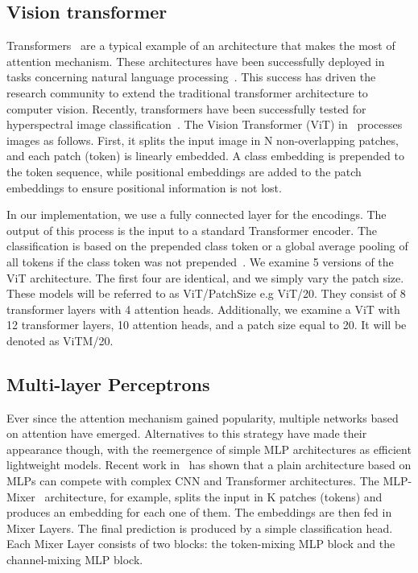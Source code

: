 \documentclass[journal]{IEEEtran}
\begin{document}
\subsection{Vision transformer}
\label{sec:vit}
Transformers~\citep{DBLP:journals/corr/VaswaniSPUJGKP17} are a typical example of an architecture that makes the most of attention mechanism. These architectures have been successfully deployed in tasks concerning natural language processing~\citep{devlin2018bert}. This success has driven the research community to extend the traditional transformer architecture to computer vision. Recently, transformers have been successfully tested for hyperspectral image classification~\citep{9565208}. 
The Vision Transformer (ViT) in~\cite{DBLP:journals/corr/abs-2010-11929} processes images as follows. First, it splits the input image in N non-overlapping patches, and each patch (token) is linearly embedded. A class embedding is prepended to the token sequence, while positional embeddings are added to the patch embeddings to ensure positional information is not lost. 

In our implementation, we use a fully connected layer for the encodings. The output of this process is the input to a standard Transformer encoder. The classification is based on the prepended class token or a global average pooling of all tokens if the class token was not prepended~\citep{arnab2021vivit}. 
 We examine 5 versions of the ViT architecture. The first four are identical, and we simply vary the patch size. These models will be referred to as ViT/PatchSize e.g ViT/20. They consist of 8 transformer layers with 4 attention heads. Additionally, we examine a ViT with 12 transformer layers, 10 attention heads, and a patch size equal to 20. It will be denoted as ViTM/20.

\subsection{Multi-layer Perceptrons}
\label{sec:mlp}
Ever since the attention mechanism gained popularity, multiple networks based on attention have emerged. Alternatives to this strategy have made their appearance though, with the reemergence of simple MLP architectures as efficient lightweight models. Recent work in~\cite{tolstikhin2021mlpmixer} has shown that a plain architecture based on MLPs can compete with complex CNN and Transformer architectures. The MLP-Mixer~\citep{tolstikhin2021mlpmixer} architecture, for example, splits the input in K patches (tokens) and produces an embedding for each one of them. The embeddings are then fed in  Mixer Layers. The final prediction is produced by a simple classification head. Each Mixer Layer consists of two blocks: the token-mixing MLP block and the channel-mixing MLP block. 
\end{document}
